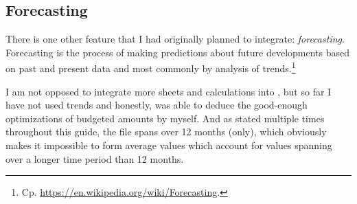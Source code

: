 \subsection{Forecasting}
\label{subsec:forecasting}

There is one other feature that I had originally planned to integrate: \emph{forecasting}.
Forecasting is the process of making predictions about future developments based on past and present data and most commonly by analysis of trends.\footnote{Cp. \href{https://en.wikipedia.org/wiki/Forecasting}{https://en.wikipedia.org/wiki/Forecasting}.}

I am not opposed to integrate more sheets and calculations into \tfn, but so far I have not used trends and honestly, was able to deduce the good-enough optimizations of budgeted amounts by myself.
And as stated multiple times throughout this guide, the file spans over 12 months (only), which obviously makes it impossible to form average values which account for values spanning over a longer time period than 12 months.